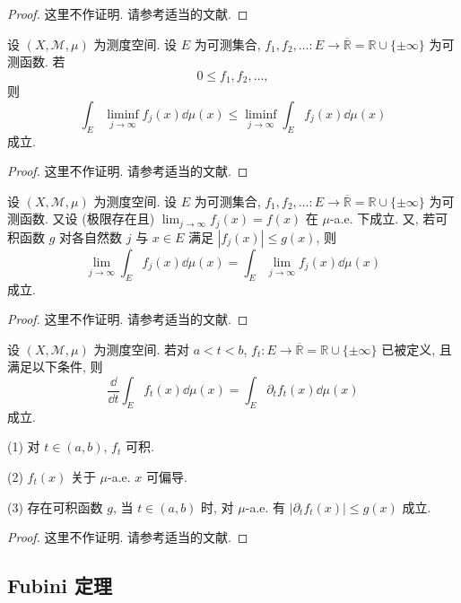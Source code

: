 \begin{proof}
这里不作证明. 请参考适当的文献.
\end{proof}

\begin{theorem}[Fatou 引理]\label{thm:2.11}
设 $(X, \mathcal{M}, \mu)$ 为测度空间. 设 $E$ 为可测集合, $f_{1}, f_{2}, \ldots: E \to \overline{\mathbb{R}} = \mathbb{R} \cup \{\pm\infty\}$ 为可测函数. 若
\[
0 \leq f_{1}, f_{2}, \ldots,
\]
则
\[
\int_{E}\liminf_{j \to \infty}f_{j}(x)\dd\mu(x) \leq \liminf_{j \to \infty}\int_{E}f_{j}(x)\dd\mu(x)
\]
成立.
\end{theorem}

\begin{proof}
这里不作证明. 请参考适当的文献.
\end{proof}

\begin{theorem}\label{thm:2.12}
设 $(X, \mathcal{M}, \mu)$ 为测度空间. 设 $E$ 为可测集合, $f_{1}, f_{2}, \ldots: E \to \overline{\mathbb{R}} = \mathbb{R} \cup \{\pm\infty\}$ 为可测函数. 又设 (极限存在且) $\lim_{j \to \infty}f_{j}(x) = f(x)$ 在 $\mu$-a.e. 下成立. 又, 若可积函数 $g$ 对各自然数 $j$ 与 $x \in E$ 满足 $|f_{j}(x)| \leq g(x)$, 则
\[
\lim_{j \to \infty}\int_{E}f_{j}(x)\dd\mu(x) = \int_{E}\lim_{j \to \infty}f_{j}(x)\dd\mu(x)
\]
成立.
\end{theorem}

\begin{proof}
这里不作证明. 请参考适当的文献.
\end{proof}

\begin{theorem}\label{thm:2.13}
设 $(X, \mathcal{M}, \mu)$ 为测度空间. 若对 $a < t < b$, $f_{t}: E \to \overline{\mathbb{R}} = \mathbb{R} \cup \{\pm\infty\}$ 已被定义, 且满足以下条件, 则
\[
\frac{\dd}{\dd t}\int_{E}f_{t}(x)\dd\mu(x) = \int_{E}\partial_{t}f_{t}(x)\dd\mu(x)
\]
成立.

(1) 对 $t \in (a, b)$, $f_{t}$ 可积.

(2) $f_{t}(x)$ 关于 $\mu$-a.e. $x$ 可偏导.

(3) 存在可积函数 $g$, 当 $t \in (a, b)$ 时, 对 $\mu$-a.e. 有 $|\partial_{t}f_{t}(x)| \leq g(x)$ 成立.
\end{theorem}

\begin{proof}
这里不作证明. 请参考适当的文献.
\end{proof}

\subsection*{Fubini 定理}

